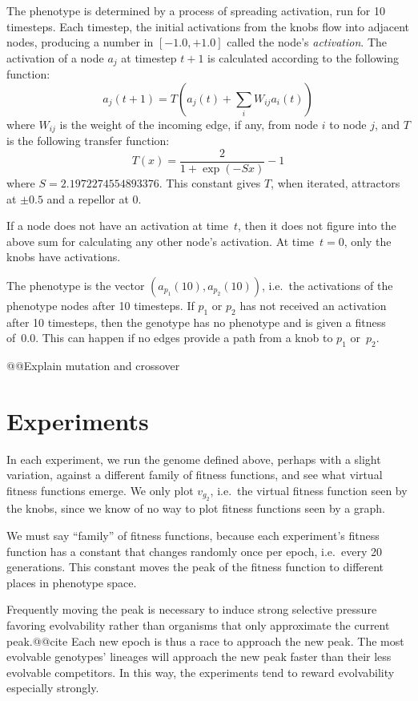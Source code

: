 \documentclass[letterpaper]{article}
\begin{document}
The phenotype is determined by a process of spreading activation, run for
10 timesteps. Each timestep, the initial activations from the knobs flow into
adjacent nodes, producing a number in $[-1.0, +1.0]$ called the node's
\textit{activation}. The activation of a node $a_j$ at timestep $t+1$ is
calculated according to the following function:
\[
   a_j(t+1) = T(a_j(t) + \sum_iW_{ij}a_i(t))
\]
where $W_{ij}$ is the weight of the incoming edge, if any, from node $i$ to
node $j$, and $T$ is the following transfer function:
\[
   T(x) = \frac{2}{1+\exp(-Sx)}-1
\]
where $S=2.1972274554893376$. This constant gives $T$, when iterated,
attractors at $\pm0.5$ and a repellor at 0.

If a node does not have an activation at time~$t$, then it does not figure
into the above sum for calculating any other node's activation. At time~$t=0$,
only the knobs have activations.

The phenotype is the vector $(a_{p_1}(10), a_{p_2}(10))$, i.e.~the activations
of the phenotype nodes after 10 timesteps. If $p_1$ or $p_2$ has not received
an activation after 10 timesteps, then the genotype has no phenotype and is
given a fitness of~0.0. This can happen if no edges provide a path from a knob
to $p_1$ or~$p_2$.

@@Explain mutation and crossover

\section{Experiments}

In each experiment, we run the genome defined above, perhaps with a slight
variation, against a different family of fitness functions, and see what
virtual fitness functions emerge. We only plot $v_{g_2}$, i.e.~the virtual
fitness function seen by the knobs, since we know of no way to plot fitness
functions seen by a graph.

We must say ``family'' of fitness functions, because each experiment's fitness
function has a constant that changes randomly once per epoch, i.e.~every 20
generations. This constant moves the peak of the fitness function to different
places in phenotype space.

Frequently moving the peak is necessary to induce strong selective pressure
favoring evolvability rather than organisms that only approximate the current
peak.@@cite Each new epoch is thus a race to approach the new peak. The most
evolvable genotypes' lineages will approach the new peak faster than their
less evolvable competitors. In this way, the experiments tend to reward
evolvability especially strongly.
\end{document}
